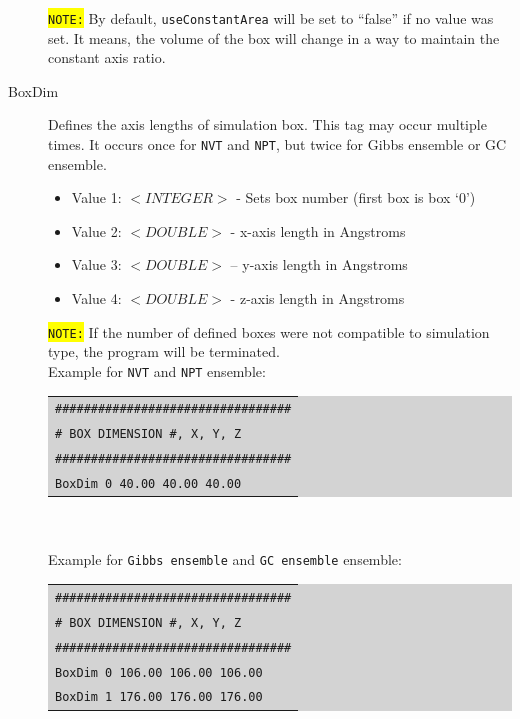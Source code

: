 \begin{description}
\begin{itemize}
	\end{itemize}
	\colorbox{yellow}{\texttt{NOTE:}} By default, \texttt{useConstantArea} will be set to ``false'' if no value was set. It means, the volume of the box will change in a way to maintain the constant axis ratio.
\item [BoxDim] Defines the axis lengths of simulation box. This tag may occur multiple times.  It occurs once for \texttt{NVT} and \texttt{NPT}, but twice for Gibbs ensemble or GC ensemble.
	\begin{itemize}
	\item Value 1: $<INTEGER>$ - Sets box number (first box is box `0')
	\item Value 2: $<DOUBLE>$ - x-axis length in Angstroms
	\item Value 3: $<DOUBLE>$ – y-axis length in Angstroms
	\item Value 4: $<DOUBLE>$ - z-axis length in Angstroms
	\end{itemize}
	\colorbox{yellow}{\texttt{NOTE:}} If the number of defined boxes were not compatible to simulation type, the program will be terminated.\\
	Example for \texttt{NVT} and \texttt{NPT} ensemble:\\
	\colorbox{lightgray}{
	\begin{tabular}{l}
	\texttt{\#\#\#\#\#\#\#\#\#\#\#\#\#\#\#\#\#\#\#\#\#\#\#\#\#\#\#\#\#\#\#\#\#}\\
	\texttt{\#  BOX DIMENSION \#, X, Y, Z}\\
	\texttt{\#\#\#\#\#\#\#\#\#\#\#\#\#\#\#\#\#\#\#\#\#\#\#\#\#\#\#\#\#\#\#\#\#}\\
	\texttt{BoxDim 0 40.00 40.00 40.00}\\
	\end{tabular}}\\\\
	Example for \texttt{Gibbs ensemble} and \texttt{GC ensemble} ensemble:\\
	\colorbox{lightgray}{
	\begin{tabular}{l}
	\texttt{\#\#\#\#\#\#\#\#\#\#\#\#\#\#\#\#\#\#\#\#\#\#\#\#\#\#\#\#\#\#\#\#\#}\\
	\texttt{\#  BOX DIMENSION \#, X, Y, Z}\\
	\texttt{\#\#\#\#\#\#\#\#\#\#\#\#\#\#\#\#\#\#\#\#\#\#\#\#\#\#\#\#\#\#\#\#\#}\\
	\texttt{BoxDim 0 106.00 106.00 106.00}\\
	\texttt{BoxDim 1 176.00 176.00 176.00}\\
	\end{tabular}}

\end{description}
